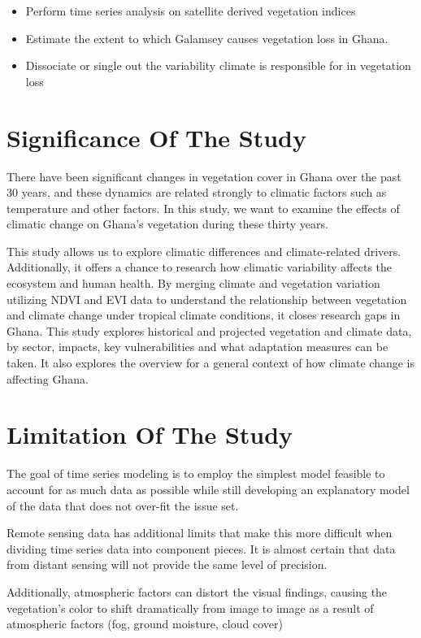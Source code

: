 \begin{itemize}
	\item Perform time series analysis on satellite derived vegetation indices
	
	\item Estimate the extent to which Galamsey causes vegetation loss in Ghana.
	
	\item Dissociate or single out the variability climate is responsible for in vegetation loss
\end{itemize}

\section{Significance Of The Study}

There have been significant changes in vegetation cover in Ghana over the past 30 years, and these dynamics are related strongly to climatic factors such as temperature and other factors. In this study, we want to examine the effects of climatic change on Ghana's vegetation during these thirty years.

This study allows us to explore climatic differences and climate-related drivers. Additionally, it offers a chance to research how climatic variability affects the ecosystem and human health. By merging climate and vegetation variation utilizing NDVI and EVI data to understand the relationship between vegetation and climate change under tropical climate conditions, it closes research gaps in Ghana. This study explores historical and projected vegetation and climate data, by sector, impacts, key vulnerabilities and what adaptation measures can be taken. It also explores the overview for a general context of how climate change is affecting Ghana.

\section{Limitation Of The Study}

The goal of time series modeling is to employ the simplest model feasible to account for as much data as possible while still developing an explanatory model of the data that does not over-fit the issue set.

Remote sensing data has additional limits that make this more difficult when dividing time series data into component pieces. It is almost certain that data from distant sensing will not provide the same level of precision.

Additionally, atmospheric factors can distort the visual findings, causing the vegetation's color to shift dramatically from image to image as a result of atmospheric factors (fog, ground moisture, cloud cover)